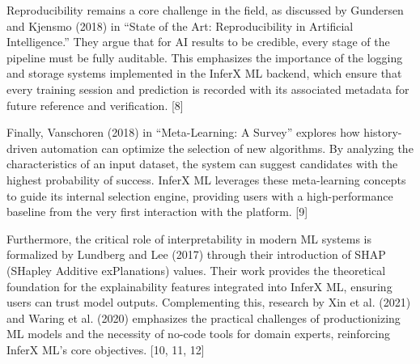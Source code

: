 Reproducibility remains a core challenge in the field, as discussed by Gundersen and Kjensmo (2018) in ``State of the Art: Reproducibility in Artificial Intelligence.'' They argue that for AI results to be credible, every stage of the pipeline must be fully auditable. This emphasizes the importance of the logging and storage systems implemented in the InferX ML backend, which ensure that every training session and prediction is recorded with its associated metadata for future reference and verification. [8]\vspace{0.4cm}

Finally, Vanschoren (2018) in ``Meta-Learning: A Survey'' explores how history-driven automation can optimize the selection of new algorithms. By analyzing the characteristics of an input dataset, the system can suggest candidates with the highest probability of success. InferX ML leverages these meta-learning concepts to guide its internal selection engine, providing users with a high-performance baseline from the very first interaction with the platform. [9]\vspace{0.4cm}

Furthermore, the critical role of interpretability in modern ML systems is formalized by Lundberg and Lee (2017) through their introduction of SHAP (SHapley Additive exPlanations) values. Their work provides the theoretical foundation for the explainability features integrated into InferX ML, ensuring users can trust model outputs. Complementing this, research by Xin et al. (2021) and Waring et al. (2020) emphasizes the practical challenges of productionizing ML models and the necessity of no-code tools for domain experts, reinforcing InferX ML's core objectives. [10, 11, 12]\vspace{0.4cm}

